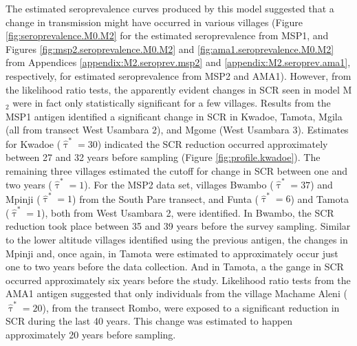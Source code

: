 The estimated seroprevalence curves produced by this model suggested that a change in transmission might have occurred in various villages (Figure \ref{fig:seroprevalence.M0.M2} for the estimated seroprevalence from MSP1, and Figures \ref{fig:msp2.seroprevalence.M0.M2} and \ref{fig:ama1.seroprevalence.M0.M2} from Appendices \ref{appendix:M2.seroprev.msp2} and \ref{appendix:M2.seroprev.ama1}, respectively, for estimated seroprevalence from MSP2 and AMA1).
However, from the likelihood ratio tests, the apparently evident changes in SCR seen in model M$_2$ were in fact only statistically significant for a few villages.
Results from the MSP1 antigen identified a significant change in SCR in Kwadoe, Tamota, Mgila (all from transect West Usambara 2), and Mgome (West Usambara 3).
Estimates for Kwadoe ($ \widehat{\uptau}^*=30$) indicated the SCR reduction occurred approximately between 27 and 32 years before sampling (Figure \ref{fig:profile.kwadoe}).
The remaining three villages estimated the cutoff for change in SCR between one and two years ($ \widehat{\uptau}^*=1$).
For the MSP2 data set, villages Bwambo ($ \widehat{\uptau}^*=37$) and Mpinji ($ \widehat{\uptau}^*=1$) from the South Pare transect, and Funta ($ \widehat{\uptau}^*=6$) and Tamota ($ \widehat{\uptau}^*=1$), both from West Usambara 2, were identified.
In Bwambo, the SCR reduction took place between 35 and 39 years before the survey sampling.
Similar to the lower altitude villages identified using the previous antigen, the changes in Mpinji and, once again, in Tamota were estimated to approximately occur just one to two years before the data collection.
And in Tamota, a the gange in SCR occurred approximately six years before the study.
Likelihood ratio tests from the AMA1 antigen suggested that only individuals from the village Machame Aleni ($ \widehat{\uptau}^*=20$), from the transect Rombo, were exposed to a significant reduction in SCR during the last 40 years.
This change was estimated to happen approximately 20 years before sampling.




